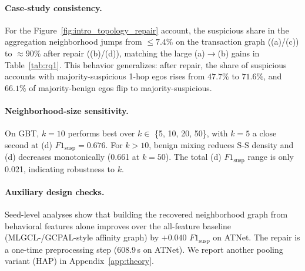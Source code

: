 \documentclass[sigconf,natbib=true,anonymous=true]{acmart}
\theoremstyle{definition}
\newcommand{\hofinet}{ATNet\xspace} %
\begin{document}
\paragraph{\textbf{Case-study consistency.}} For the Figure~\ref{fig:intro_topology_repair} account, the suspicious share in the aggregation neighborhood jumps from $\le 7.4\%$ on the transaction graph ((a)/(c)) to $\approx 90\%$ after repair ((b)/(d)), matching the large (a)$\to$(b) gains in Table~\ref{tab:rq1}. This behavior generalizes: after repair, the share of suspicious accounts with majority-suspicious 1-hop egos rises from $47.7\%$ to $71.6\%$, and $66.1\%$ of majority-benign egos flip to majority-suspicious.

\paragraph{\textbf{Neighborhood-size sensitivity.}} On GBT, $k{=}10$ performs best over $k \in $ \{5, 10, 20, 50\}, with $k{=}5$ a close second at (d) $F1_{\text{susp}}{=}0.676$. For $k>10$, benign mixing reduces S-S density and (d) decreases monotonically (0.661 at $k{=}50$). The total (d) $F1_{\text{susp}}$ range is only 0.021, indicating robustness to $k$.

\paragraph{\textbf{Auxiliary design checks.}} Seed-level analyses show that building the recovered neighborhood graph from behavioral features alone improves over the all-feature baseline (MLGCL-/GCPAL-style affinity graph) by $+0.040$ $F1_{\text{susp}}$ on \hofinet. The repair is a one-time preprocessing step (608.9\,s on \hofinet). We report another pooling variant (HAP) in Appendix~\ref{app:theory}.
\end{document}
